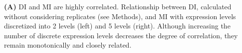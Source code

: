
\textbf{(A)} DI and MI are highly correlated. Relationship between DI, calculated without considering replicates (see Methods), and MI with expression levels discretized into 2 levels (left) and 5 levels (right). Although increasing the number of discrete expression levels decreases the degree of correlation, they remain monotonically and closely related.
